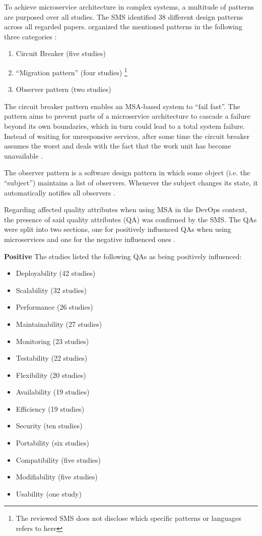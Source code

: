 To achieve microservice architecture in complex systems, a multitude of
patterns are purposed over all studies. The SMS identified 38 different design
patterns across all regarded papers. \smsAuthors organized the mentioned
patterns in the following three categories \cite{waseem:SMSMSADevOps}:

\begin{enumerate}
    \item Circuit Breaker (five studies)
    \item ``Migration pattern'' (four studies) \cite{waseem:SMSMSADevOps}
    \footnote{The reviewed SMS does not disclose which specific patterns or languages
    refers to here}
    \item Observer pattern (two studies)
\end{enumerate}

The circuit breaker pattern enables an MSA-based system to ``fail fast''. 
The pattern aims to prevent parts of a microservice architecture to cascade
a failure beyond its own boundaries, which in turn could lead to a total
system failure. Instead of waiting for unresponsive services, after some time
the circuit breaker assumes the worst and deals with the fact that the
work unit has become unavailable \cite{montesi:CircuitBreakers}.

The observer pattern is a software design pattern in which some object (i.e. the ``subject'')
maintains a list of observers. Whenever the subject changes its state, it automatically
notifies all observers \cite{gof:DesignPatterns}.

Regarding affected quality attributes when using MSA in the DevOps context,
the presence of said quality attributes (QA) was confirmed by the SMS.
The QAs were split into two sections, one for positively influenced QAs when
using microservices and one for the negative influenced ones \cite{waseem:SMSMSADevOps}.

\textbf{Positive}
The studies listed the following QAs as being positively influenced:
\begin{itemize}
    \item Deployability (42 studies)
    \item Scalability (32 studies)
    \item Performance (26 studies)
    \item Maintainability (27 studies)
    \item Monitoring (23 studies)
    \item Testability (22 studies)
    \item Flexibility (20 studies)
    \item Availability (19 studies)
    \item Efficiency (19 studies)
    \item Security (ten studies)
    \item Portability (six studies)
    \item Compatibility (five studies)
    \item Modifiability (five studies)
    \item Usability (one study)
\end{itemize}

